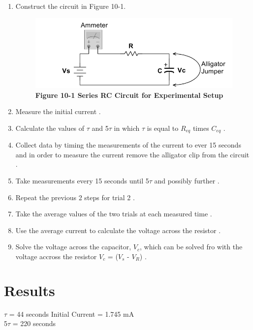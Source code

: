 \documentclass[a4paper]{article}
\begin{document}
\begin{enumerate}
    \item Construct the circuit in Figure 10-1\cite{UNCC-ECE-Dept:2023}.
    \begin{figure}[H]\label{fig10-1}
        \begin{center}
            \includegraphics[width = 7 cm]{fig10-1}\\
            \small\textbf{Figure 10-1 Series RC Circuit for Experimental Setup \cite{UNCC-ECE-Dept:2023}}
        \end{center}
    \end{figure} 
    \item Measure the initial current \cite{UNCC-ECE-Dept:2023}.
    \item Calculate the values of $\tau$ and 5$\tau$ in which $\tau$ is equal to $R_{eq}$ times $C_{eq}$ \cite{UNCC-ECE-Dept:2023}.
    \item Collect data by timing the measurements of the current to ever 15 seconds and in order to measure the current remove the alligator clip from the circuit \cite{UNCC-ECE-Dept:2023}.
    \item Take measurements every 15 seconds until 5$\tau$ and possibly further \cite{UNCC-ECE-Dept:2023}.
    \item Repeat the previous 2 steps for trial 2 \cite{UNCC-ECE-Dept:2023}.
    \item Take the average values of the two trials at each measured time \cite{UNCC-ECE-Dept:2023}.
    \item Use the average current to calculate the voltage across the resistor \cite{UNCC-ECE-Dept:2023}.
    \item Solve the voltage across the capacitor, $V_{c}$, which can be solved fro with the voltage accross the resistor $V_{c}$ = ($V_{s}$ - $V_{R}$) \cite{UNCC-ECE-Dept:2023}.  
\end{enumerate}


\section{Results}
$\tau$ = 44 seconds  Initial Current = 1.745 mA  \\
5$\tau$ =  220 seconds \\
\end{document}

